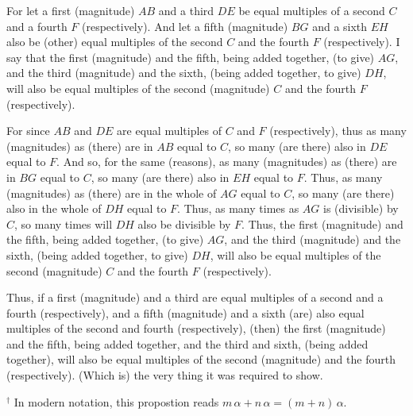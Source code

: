 \begin{Parallel}{}{}
{For let a first (magnitude) $AB$ and a third $DE$ be equal multiples of a
second $C$ and a fourth $F$ (respectively). And let a fifth (magnitude) $BG$
and a sixth $EH$ also be (other) equal multiples of the second $C$ and the fourth $F$
(respectively). I say that the first (magnitude) and the fifth, being added together, (to give) $AG$,
and the third (magnitude) and the sixth, (being added together, to give) $DH$, will also be
equal multiples of the second (magnitude) $C$ and the fourth $F$ (respectively).

For since $AB$ and $DE$ are equal multiples of $C$ and $F$ (respectively), 
thus as many (magnitudes) as (there) are in $AB$ equal to $C$, so many (are there) also
in $DE$ equal to $F$.  And so, for the same (reasons),   as many (magnitudes) as (there) are in $BG$ equal to $C$, so many (are there) also in $EH$ equal to $F$.
Thus, as many (magnitudes) as (there) are in the whole of $AG$ equal to $C$,
so many (are there) also in the whole of $DH$ equal to $F$.
Thus, as many times as $AG$ is (divisible) by $C$, so many times will $DH$ also
be divisible by $F$. Thus, the first (magnitude) and the fifth, being
added together, (to give) $AG$, and the third (magnitude) and the sixth, (being
added together, to give) $DH$, will also be equal multiples of the second (magnitude)
$C$ and the fourth $F$ (respectively).

\epsfysize=1.5in
\centerline{}

Thus, if a first (magnitude) and a third are equal multiples of a second
and a fourth (respectively), and a fifth (magnitude) and a sixth (are) also equal multiples of the
second and fourth (respectively), (then) the  first (magnitude) and the fifth, being
added together, and the third  and sixth, (being added together), will also be equal multiples of the
second (magnitude) and the fourth (respectively). (Which is) the very thing it was required to
show.}
\end{Parallel}
{\footnotesize \noindent$^\dag$ In modern notation, this propostion reads
$m\,\alpha+n\,\alpha = (m+n)\,\alpha$.}

